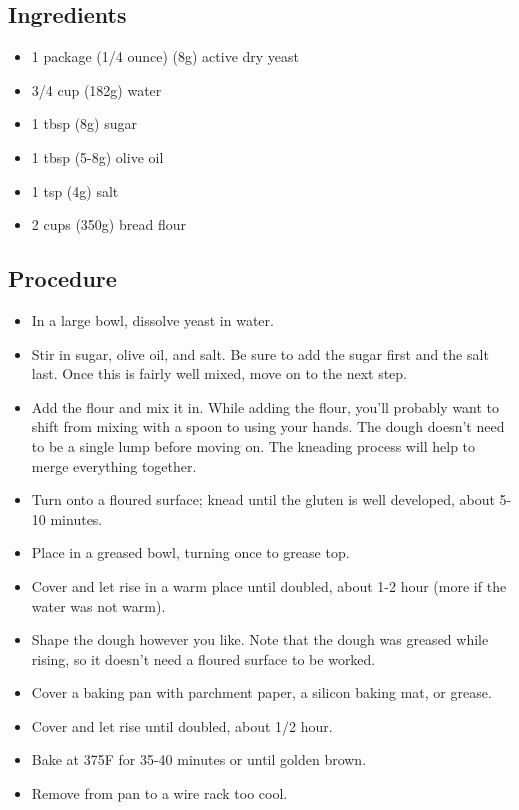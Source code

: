 \documentclass[10pt, openany]{book}
\begin{document}
\subsection{Ingredients}
\begin{itemize}
  \item 1 package (1/4 ounce) (8g) active dry yeast
  \item 3/4 cup (182g) water
  \item 1 tbsp (8g) sugar
  \item 1 tbsp (5-8g) olive oil
  \item 1 tsp (4g) salt
  \item 2 cups (350g) bread flour
\end{itemize}
\subsection{Procedure}
\begin{itemize}
  \item In a large bowl, dissolve yeast in water.
  \item Stir in sugar, olive oil, and salt.  Be sure to add the sugar first and the salt last.  Once this is fairly well mixed, move on to the next step.
  \item Add the flour and mix it in.  While adding the flour, you'll probably want to shift from mixing with a spoon to using your hands.  The dough doesn't need to be a single lump before moving on.  The kneading process will help to merge everything together.
  \item Turn onto a floured surface; knead until the gluten is well developed, about 5-10 minutes.
  \item Place in a greased bowl, turning once to grease top.
  \item Cover and let rise in a warm place until doubled, about 1-2 hour (more if the water was not warm).
  \item Shape the dough however you like.  Note that the dough was greased while rising, so it doesn't need a floured surface to be worked.
  \item Cover a baking pan with parchment paper, a silicon baking mat, or grease.
  \item Cover and let rise until doubled, about 1/2 hour.
  \item Bake at 375\degree{}F for 35-40 minutes or until golden brown.
  \item Remove from pan to a wire rack too cool.
\end{itemize}
\end{document}
